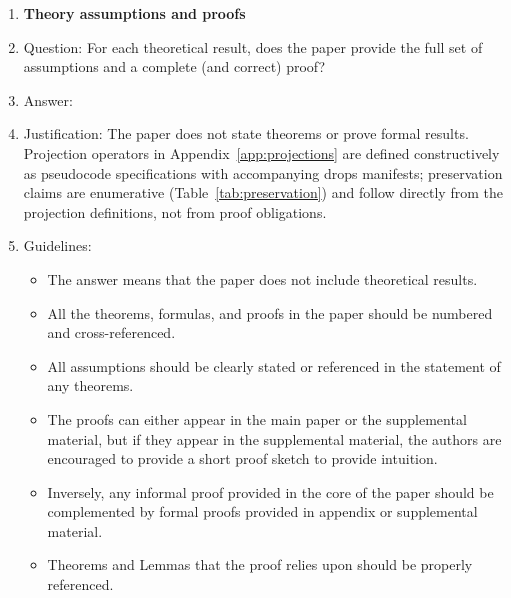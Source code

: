 \begin{enumerate}
\begin{itemize}
        \item If applicable, the authors should discuss possible limitations of their approach to address problems of privacy and fairness.
        \item While the authors might fear that complete honesty about limitations might be used by reviewers as grounds for rejection, a worse outcome might be that reviewers discover limitations that aren't acknowledged in the paper. The authors should use their best judgment and recognize that individual actions in favor of transparency play an important role in developing norms that preserve the integrity of the community. Reviewers will be specifically instructed to not penalize honesty concerning limitations.
    \end{itemize}

\item {\bf Theory assumptions and proofs}
    \item[] Question: For each theoretical result, does the paper provide the full set of assumptions and a complete (and correct) proof?
    \item[] Answer: \answerNA{}
    \item[] Justification: The paper does not state theorems or prove formal results. Projection operators in Appendix~\ref{app:projections} are defined constructively as pseudocode specifications with accompanying drops manifests; preservation claims are enumerative (Table~\ref{tab:preservation}) and follow directly from the projection definitions, not from proof obligations.
    \item[] Guidelines:
    \begin{itemize}
        \item The answer \answerNA{} means that the paper does not include theoretical results.
        \item All the theorems, formulas, and proofs in the paper should be numbered and cross-referenced.
        \item All assumptions should be clearly stated or referenced in the statement of any theorems.
        \item The proofs can either appear in the main paper or the supplemental material, but if they appear in the supplemental material, the authors are encouraged to provide a short proof sketch to provide intuition.
        \item Inversely, any informal proof provided in the core of the paper should be complemented by formal proofs provided in appendix or supplemental material.
        \item Theorems and Lemmas that the proof relies upon should be properly referenced.
    \end{itemize}


\end{enumerate}
